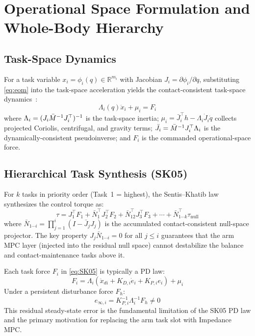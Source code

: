 \section{Operational Space Formulation and Whole-Body Hierarchy}
\label{sec:osf}

\subsection{Task-Space Dynamics}

For a task variable $x_i=\phi_i(q)\in\mathbb{R}^{m_i}$ with Jacobian
$J_i=\partial\phi_i/\partial q$, substituting \eqref{eq:eom} into the
task-space acceleration yields the contact-consistent task-space
dynamics~\cite{khatib1987unified,righetti2011inverse}:
\begin{equation}\label{eq:taskdyn}
  \Lambda_i(q)\ddot{x}_i + \mu_i = F_i
\end{equation}
where $\Lambda_i=(J_i\bar{M}^{-1} J_i^\top)^{-1}$ is the task-space inertia;
$\mu_i=\bar{J}_i^\top h - \Lambda_i\dot{J}_i\dot{q}$ collects projected
Coriolis, centrifugal, and gravity terms; $\bar{J}_i=\bar{M}^{-1} J_i^\top\Lambda_i$
is the dynamically-consistent pseudoinverse; and $F_i$ is the commanded
operational-space force.

\subsection{Hierarchical Task Synthesis (SK05)}

For $k$ tasks in priority order (Task~1 = highest), the Sentis--Khatib
law~\cite{sentis2005synthesis} synthesizes the control torque as:
\begin{equation}\label{eq:SK05}
  \tau = J_1^\top F_1 + \bar{N}_1^\top J_2^\top F_2
       + \bar{N}_{12}^\top J_3^\top F_3 + \cdots
       + \bar{N}_{1\cdots k}^\top\tau_{\text{null}}
\end{equation}
where $\bar{N}_{1\cdots i}=\prod_{j=1}^{i}(I-\bar{J}_jJ_j)$ is the
accumulated contact-consistent null-space projector.
The key property $J_j\bar{N}_{1\cdots i}=0$ for all $j\leq i$ guarantees
that the arm MPC layer (injected into the residual null space) cannot
destabilize the balance and contact-maintenance tasks above it.

Each task force $F_i$ in \eqref{eq:SK05} is typically a PD law:
\begin{equation}\label{eq:PD}
  F_i = \Lambda_i(\ddot{x}_{di}+K_{D,i}\dot{e}_i+K_{P,i}e_i)+\mu_i
\end{equation}
Under a persistent disturbance force $F_h$:
\begin{equation}\label{eq:sse}
  e_{\infty,i} = K_{P,i}^{-1}\Lambda_i^{-1}F_h \neq 0
\end{equation}
This residual steady-state error is the fundamental limitation of the SK05
PD law and the primary motivation for replacing the arm task slot with
Impedance MPC.

